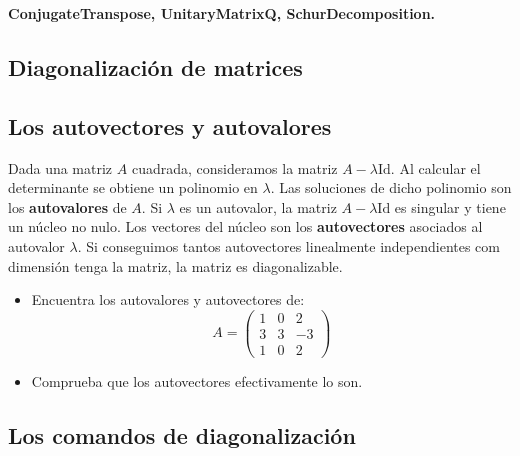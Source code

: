 \documentclass[a4paper,10pt, draft]{article}
\newenvironment{capitulo}{\begin{tcolorbox}[colback=red!5!white,colframe=red!75!black]}{\end{tcolorbox}\bigskip}
\newenvironment{ejer}{\begin{tcolorbox}[center title, title=Ejercicios,
fonttitle=\sffamily\bfseries,colback=blue!5,colframe=orange]}{\end{tcolorbox}}
\newenvironment{funciones}{\begin{tcolorbox}[center title, title=Nuevas funciones, fonttitle=\sffamily\bfseries, colback=green!5!white,colframe=red!75!black]}{\end{tcolorbox}\bigskip}
\begin{document}
\begin{funciones}

\textbf{ConjugateTranspose,  UnitaryMatrixQ, SchurDecomposition.}


\end{funciones}


\newpage

\begin{capitulo}

\section{Diagonalización de matrices}

\end{capitulo}

\subsection{Los autovectores y autovalores}

Dada una matriz $A$ cuadrada, consideramos la matriz $A- \lambda \mathrm{Id}$.  Al calcular el determinante se obtiene un polinomio en $\lambda$. Las soluciones de dicho polinomio son los \textbf{autovalores} de $A$. Si $\lambda$ es un autovalor, la matriz $A- \lambda \mathrm{Id}$ es singular y tiene un núcleo no nulo. Los vectores del núcleo son los \textbf{autovectores} asociados al autovalor $\lambda$. Si conseguimos  tantos autovectores linealmente independientes com dimensión tenga la matriz, la matriz es diagonalizable.

\begin{ejer}

\begin{itemize}

\item Encuentra los autovalores y autovectores de:
$$A=
\begin{pmatrix}
1 & 0 &2\\
3& 3&-3\\
1&0&2
\end{pmatrix}
$$


\item Comprueba que los autovectores efectivamente lo son.

\end{itemize}

\end{ejer}

\newpage



\subsection{Los comandos de diagonalización}
\end{document}
